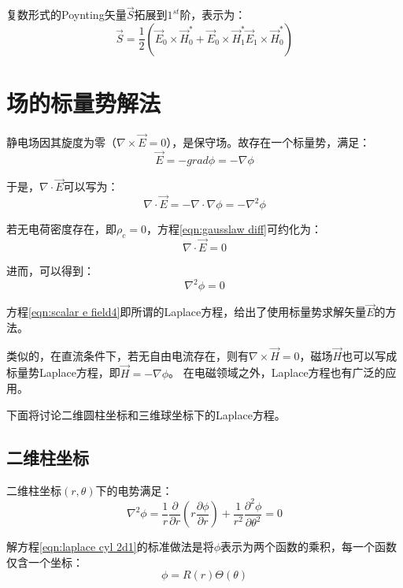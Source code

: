 复数形式的Poynting矢量$\vec{S}$拓展到$1^{st}$阶，表示为：
\begin{equation}\label{eqn:1st poynting}
\vec{S}=\frac{1}{2}(\vec{E}_0\times \vec{H}_0^*+\vec{E}_0\times \vec{H}_1^*\vec{E}_1\times \vec{H}_0^*)
\end{equation}

\section{场的标量势解法}
静电场因其旋度为零（$\nabla \times \vec{E}=0$），是保守场。故存在一个标量势，满足：
\begin{equation}\label{eqn:scalar e field1}
  \vec{E}=-grad\phi = -\nabla \phi
\end{equation}

于是，$\nabla\cdot\vec{E}$可以写为：
\begin{equation}\label{eqn:scalar e field2}
  \nabla\cdot\vec{E}=-\nabla\cdot\nabla\phi=-\nabla^2\phi
\end{equation}

若无电荷密度存在，即$\rho_c=0$，方程\ref{eqn:gausslaw diff}可约化为：
\begin{equation}\label{eqn:scalar e field3}
  \nabla\cdot\vec{E}=0
\end{equation}

进而，可以得到：
\begin{equation}\label{eqn:scalar e field4}
\nabla^2\phi=0
\end{equation}

方程\ref{eqn:scalar e field4}即所谓的Laplace方程，给出了使用标量势求解矢量$\vec{E}$的方法。

类似的，在直流条件下，若无自由电流存在，则有$\nabla\times \vec{H}=0$，磁场$\vec{H}$也可以写成标量势Laplace方程，即$\vec{H}=-\nabla \phi$。
在电磁领域之外，Laplace方程也有广泛的应用。

下面将讨论二维圆柱坐标和三维球坐标下的Laplace方程。
\subsection{二维柱坐标}
二维柱坐标$(r,\theta)$下的电势满足：
\begin{equation}\label{eqn:laplace cyl 2d1}
  \nabla^2\phi = \frac{1}{r}\frac{\partial}{\partial r}(r\frac{\partial \phi}{\partial r})+\frac{1}{r^2}\frac{\partial^2\phi}{\partial\theta^2}=0
\end{equation}

解方程\ref{eqn:laplace cyl 2d1}的标准做法是将$\phi$表示为两个函数的乘积，每一个函数仅含一个坐标：
\begin{equation}\label{eqn:laplace cyl 2d2}
  \phi=R(r)\Theta(\theta)
\end{equation}

